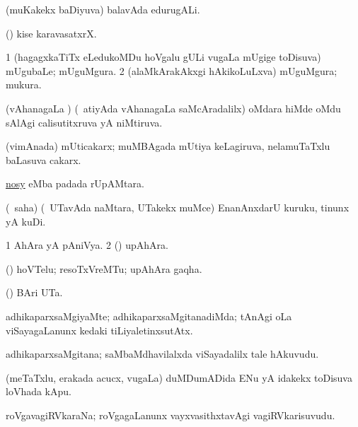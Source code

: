 \bentry
{}
\gl{\nA}
\bmng
(muKakekx baDiyuva) balavAda edurugALi. 
\emng
\eentry

\bentry
{}
\gl{\nA}
\bmng
(\ashi) kise karavasatxrX. 
\emng
\eentry

\bentry
{}
\gl{\nA}
\bmng
\bnum
\num{1} (hagagxkaTiTx eLedukoMDu hoVgalu gULi \mo vugaLa mUgige toDisuva) mUgubaLe; mUguMgura. 
\num{2} (alaMkArakAkxgi hAkikoLuLxva) mUguMgura; mukura. 
\enum
\emng
\eentry

\bentry
{}
\gl{\gu}
\bmng
(vAhanagaLa \vi) (\kanmu\ atiyAda vAhanagaLa saMcAradalilx) oMdara hiMde oMdu sAlAgi calisutitxruva yA niMtiruva. 
\emng
\eentry

\bentry
{}
\gl{\nA}
\bmng
(vimAnada) mUticakarx; muMBAgada mUtiya keLagiruva, nelamuTaTxlu baLasuva cakarx. 
\emng
\eentry

\bentry
{}
\bmng
 \hyperlink{nosy(1)}{nosy} eMba padada rUpAMtara. 
\emng
\eentry

\bentry
{}
\gl{\sakirx}
\bmng
(\akirx\ saha) (\kanmu\ UTavAda naMtara, UTakekx muMce) EnanAnxdarU kuruku, tinunx yA kuDi. 
\emng
\eentry

\bentry
{}
\gl{\nA}
\bmng
\bnum
\num{1} AhAra yA pAniVya. 
\num{2} (\ame) upAhAra. 
\enum
\emng
\eentry

\bentry
{}
\gl{\nA}
\bmng
(\ashi) hoVTelu; resoTxVreMTu; upAhAra gaqha. 
\emng
\eentry

\bentry
{}
\gl{\nA}
\bmng
(\birx) BAri UTa. 
\emng
\eentry

\bentry
{}
\gl{\kirxvi}
\bmng
adhikaparxsaMgiyaMte; adhikaparxsaMgitanadiMda; tAnAgi oLa viSayagaLanunx kedaki tiLiyaletinxsutAtx. 
\emng
\eentry

\bentry
{}
\gl{\nA}
\bmng
adhikaparxsaMgitana; saMbaMdhavilalxda viSayadalilx tale hAkuvudu. 
\emng
\eentry

\bentry
{}
\gl{\nA}
\bmng
(meTaTxlu, erakada acucx, \mo vugaLa) duMDumADida ENu yA idakekx toDisuva loVhada kApu. 
\emng
\eentry

\bentry
{}
\gl{\nA}
\bmng
roVgavagiRVkaraNa; roVgagaLanunx vayxvasithxtavAgi vagiRVkarisuvudu. 
\emng
\eentry

